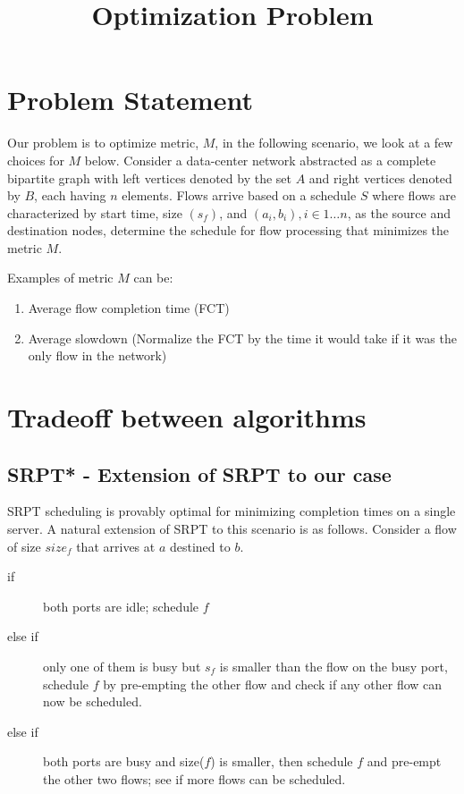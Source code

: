 \documentclass[12pt]{article}
\title{Optimization Problem}
\begin{document}
\maketitle
\section{Problem Statement}
Our problem is to optimize metric, $M$, in the following scenario, we look at a few choices for $M$ below. Consider a data-center network abstracted as a complete bipartite graph with left vertices denoted by the set $A$ and right vertices denoted by $B$, each having $n$ elements. Flows arrive based on a schedule $S$ where flows are characterized by start time, size $(s_f)$, and $(a_i, b_i), i \in {1 \dots n}$, as the source and destination nodes, determine the schedule for flow processing that minimizes the metric $M$.
  
Examples of metric $M$ can be:
\begin{enumerate}
    \item Average flow completion time (FCT)
    \item Average slowdown (Normalize the FCT by the time it would take if it was the only flow in the network)
\end{enumerate}

\section{Tradeoff between algorithms}
\subsection{SRPT* - Extension of SRPT to our case}
SRPT scheduling is provably optimal for minimizing completion times on a single server. 
A natural extension of SRPT to this scenario is as follows. Consider a flow of size $size_f$ that arrives at $a$ destined to $b$. 
  \begin{description}
    \item[if] both ports are idle; schedule $f$
    \item[else if] only one of them is busy but $s_f$ is smaller than the flow on the busy port, schedule $f$ by pre-empting the other flow and check if any other flow can now be scheduled.
    \item[else if] both ports are busy and size($f$) is smaller, then schedule $f$ and pre-empt the other two flows; see if more flows can be scheduled.
  \end{description}
\end{document}
